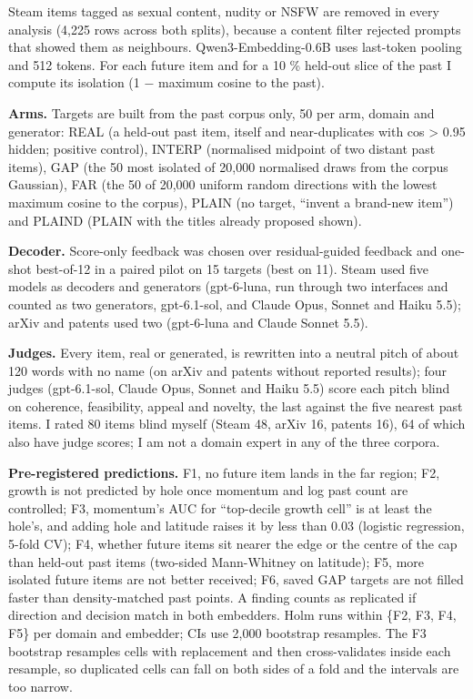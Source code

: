 \documentclass[
  10pt,
]{article}
\begin{document}
Steam items tagged as sexual content,
nudity or NSFW are removed in every
analysis (4,225 rows across both
splits), because a content filter
rejected prompts that showed them as
neighbours. Qwen3-Embedding-0.6B uses
last-token pooling and 512 tokens. For
each future item and for a 10 \%
held-out slice of the past I compute its
isolation (1 − maximum cosine to the
past).

\textbf{Arms.} Targets are built from
the past corpus only, 50 per arm, domain
and generator: REAL (a held-out past
item, itself and near-duplicates with
cos \textgreater{} 0.95 hidden; positive
control), INTERP (normalised midpoint of
two distant past items), GAP (the 50
most isolated of 20,000 normalised draws
from the corpus Gaussian), FAR (the 50
of 20,000 uniform random directions with
the lowest maximum cosine to the
corpus), PLAIN (no target, ``invent a
brand-new item'') and PLAIND (PLAIN with
the titles already proposed shown).

\textbf{Decoder.} Score-only feedback
was chosen over residual-guided feedback
and one-shot best-of-12 in a paired
pilot on 15 targets (best on 11). Steam
used five models as decoders and
generators (gpt-6-luna, run through two
interfaces and counted as two
generators, gpt-6.1-sol, and Claude
Opus, Sonnet and Haiku 5.5); arXiv and
patents used two (gpt-6-luna and Claude
Sonnet 5.5).

\textbf{Judges.} Every item, real or
generated, is rewritten into a neutral
pitch of about 120 words with no name
(on arXiv and patents without reported
results); four judges (gpt-6.1-sol,
Claude Opus, Sonnet and Haiku 5.5) score
each pitch blind on coherence,
feasibility, appeal and novelty, the
last against the five nearest past
items. I rated 80 items blind myself
(Steam 48, arXiv 16, patents 16), 64 of
which also have judge scores; I am not a
domain expert in any of the three
corpora.

\textbf{Pre-registered predictions.} F1,
no future item lands in the far region;
F2, growth is not predicted by hole once
momentum and log past count are
controlled; F3, momentum's AUC for
``top-decile growth cell'' is at least
the hole's, and adding hole and latitude
raises it by less than 0.03 (logistic
regression, 5-fold CV); F4, whether
future items sit nearer the edge or the
centre of the cap than held-out past
items (two-sided Mann-Whitney on
latitude); F5, more isolated future
items are not better received; F6, saved
GAP targets are not filled faster than
density-matched past points. A finding
counts as replicated if direction and
decision match in both embedders. Holm
runs within \{F2, F3, F4, F5\} per
domain and embedder; CIs use 2,000
bootstrap resamples. The F3 bootstrap
resamples cells with replacement and
then cross-validates inside each
resample, so duplicated cells can fall
on both sides of a fold and the
intervals are too narrow.
\end{document}
